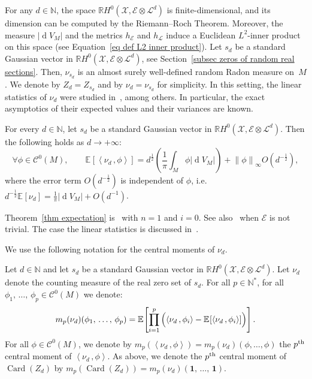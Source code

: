 \documentclass[AHL,Unicode,longabstracts,published]{cedram}
\DeclareMathOperator{\card}{Card}
\DeclareMathOperator{\dmesure}{d}
\newcommand{\E}{\mathcal{E}}
\newcommand{\X}{\mathcal{X}}
\renewcommand{\L}{\mathcal{L}}
\newcommand{\clC}{\mathcal{C}}
\newcommand{\N}{\mathbb{N}}
\newcommand{\R}{\mathbb{R}}
\newcommand{\bfun}{\mathbf{1}}
\newcommand{\esp}[2][]{\mathbb{E}_{#1}\!\left[#2 \right]}
\newcommand{\norm}[1]{\left\lvert #1 \right\rvert}
\newcommand{\Norm}[1]{\left\lVert #1 \right\rVert}
\newcommand{\prsc}[2]{\left\langle #1\,, #2 \right\rangle}
\newcommand{\rmes}[1]{\norm{\dmesure\! V_{#1}}}
\renewcommand{\H}{H^0(\X,\E \otimes \L^d)}
\let\oldforall\forall
\renewcommand*{\forall}{\mathrel{\oldforall}}
\begin{document}
For any $d \in \N$, the space $\R \H$ is finite-dimensional, and its dimension can be computed by the Riemann--Roch Theorem. Moreover, the measure $\rmes{M}$ and the metrics $h_\E$ and $h_\L$ induce a Euclidean $L^2$-inner product on this space (see Equation~\eqref{eq def L2 inner product}). Let $s_d$ be a standard Gaussian vector in $\R \H$, see Section~\ref{subsec zeros of random real sections}. Then, $\nu_{s_d}$ is an almost surely well-defined random Radon measure on~$M$. We denote by $Z_d = Z_{s_d}$ and by $\nu_d = \nu_{s_d}$ for simplicity. In this setting, the linear statistics of $\nu_d$ were studied in~\cite{Anc2019,GW2016,Let2016,LP2019}, among others. In particular, the exact asymptotics of their expected values and their variances are known.

\begin{theo}\label{thm expectation}
For every $d \in \N$, let $s_d$ be a standard Gaussian vector in $\R \H$. Then the following holds as $d \to +\infty$:
\[
\forall \phi \in \clC^0(M), \qquad \esp{\prsc{\nu_d}{\phi}} = d^\frac{1}{2} \left(\frac{1}{\pi}\int_M \phi \rmes{M}\right) + \Norm{\phi}_\infty O\left(d^{-\frac{1}{2}}\right),
\]
where the error term $O(d^{-\frac{1}{2}})$ is independent of $\phi$, i.e. $d^{-\frac{1}{2}}\esp{\nu_d} = \frac{1}{\pi}\rmes{M} + O(d^{-1})$.
\end{theo}

Theorem~\ref{thm expectation} is~\cite[Theorem~1.2]{GW2016} with $n=1$ and $i=0$. See also~\cite[Theorem~1.3]{Let2016} when $\E$ is not trivial. The case the linear statistics is discussed in~\cite[Section~5.3]{Let2016}.

We use the following notation for the central moments of $\nu_d$.

\begin{defi}\label{def m p nu d}
Let $d \in \N$ and let $s_d$ be a standard Gaussian vector in $\R \H$. Let $\nu_d$ denote the counting measure of the real zero set of $s_d$. For all $p \in \N^*$, for all $\phi_1,\,\dots,\,\phi_p \in \clC^0(M)$ we denote:
\[
m_p(\nu_d)(\phi_1,\,\dots,\,\phi_p) = \esp{\prod_{i=1}^p \left(\prsc{\nu_d}{\phi_i}-\rule{0pt}{10pt}\esp{\prsc{\nu_d}{\phi_i}}\right)}.
\]
For all $\phi \in \clC^0(M)$, we denote by $m_p(\prsc{\nu_d}{\phi}) = m_p(\nu_d)(\phi,\dots,\phi)$ the $p^{\rm th}$ central moment of $\prsc{\nu_d}{\phi}$. As above, we denote the $p^{\rm th}$ central moment of $\card(Z_d)$ by $m_p(\card(Z_d)) = m_p(\nu_d)(\bfun,\,\dots,\,\bfun)$.
\end{defi}
\end{document}
